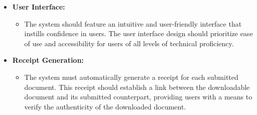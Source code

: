 \documentclass[a4paper,11pt]{article}
\begin{document}
\begin{itemize}
            \item \textbf{User Interface:} 
            \begin{itemize}
                \item The system should feature an intuitive and user-friendly interface that instills confidence in users. The user interface design should prioritize ease of use and accessibility for users of all levels of technical proficiency.
            \end{itemize}
            
            \item \textbf{Receipt Generation:} 
            \begin{itemize}
                \item The system must automatically generate a receipt for each submitted document. This receipt should establish a link between the downloadable document and its submitted counterpart, providing users with a means to verify the authenticity of the downloaded document.
            \end{itemize}
        \end{itemize}
        
\end{document}
